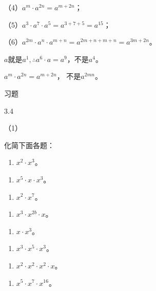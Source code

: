 （4）\(a^m \cdot a^{2n} = a^{m+2n}\)；

（5）\(a^3 \cdot a^7 \cdot a^5 = a^{3+7+5} = a^{15}\)；

（6）\(a^{2m} \cdot a^n \cdot a^{m+n} = a^{2m+n+m+n} = a^{3m+2n}\)。

\(a\)就是\(a^1, \therefore a^6 \cdot a = a^9\)，不是\(a^4\)。

\(a^{m} \cdot a^{2n} = a^{m+2n}\)， 不是\(a^{2mn}\)。

习题

3.4

（1）

化简下面各题：

\begin{enumerate}[start=1]
\item
  \(x^{2} \cdot x^{3}\)。
\end{enumerate}

\begin{enumerate}[start=4]
\item
  \(x^{5} \cdot x \cdot x^{3}\)。
\end{enumerate}

\begin{enumerate}[start=7]
\item
  \(x^{2} \cdot x^{7}\)。
\end{enumerate}

\begin{enumerate}[start=10]
\item
  \(x^{3} \cdot x^{2b} \cdot x\)。
\end{enumerate}

\begin{enumerate}[start=2]
\item
  \(x \cdot x^3\)。
\end{enumerate}

\begin{enumerate}[start=5]
\item
  \(x^{3} \cdot x^{5} \cdot x^{3}\)。
\end{enumerate}

\begin{enumerate}[start=8]
\item
  \(x^{2} \cdot x^{2} \cdot x^{2} \cdot x\)。
\end{enumerate}

\begin{enumerate}[start=3]
\item
  \(x^{5} \cdot x^{7} \cdot x^{16}\)。
\end{enumerate}

